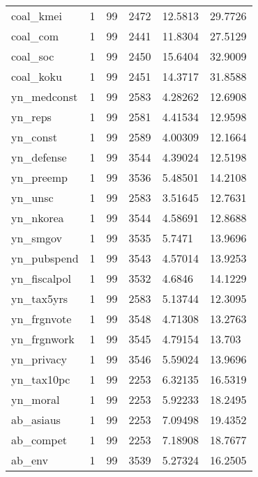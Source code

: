 \begin{tabular}{llllll}
coal\_kmei     &        1 &         99 &  2472 &   12.5813 &   29.7726 \\
coal\_com      &        1 &         99 &  2441 &   11.8304 &   27.5129 \\
coal\_soc      &        1 &         99 &  2450 &   15.6404 &   32.9009 \\
coal\_koku     &        1 &         99 &  2451 &   14.3717 &   31.8588 \\
yn\_medconst   &        1 &         99 &  2583 &   4.28262 &   12.6908 \\
yn\_reps       &        1 &         99 &  2581 &   4.41534 &   12.9598 \\
yn\_const      &        1 &         99 &  2589 &   4.00309 &   12.1664 \\
yn\_defense    &        1 &         99 &  3544 &   4.39024 &   12.5198 \\
yn\_preemp     &        1 &         99 &  3536 &   5.48501 &   14.2108 \\
yn\_unsc       &        1 &         99 &  2583 &   3.51645 &   12.7631 \\
yn\_nkorea     &        1 &         99 &  3544 &   4.58691 &   12.8688 \\
yn\_smgov      &        1 &         99 &  3535 &    5.7471 &   13.9696 \\
yn\_pubspend   &        1 &         99 &  3543 &   4.57014 &   13.9253 \\
yn\_fiscalpol  &        1 &         99 &  3532 &    4.6846 &   14.1229 \\
yn\_tax5yrs    &        1 &         99 &  2583 &   5.13744 &   12.3095 \\
yn\_frgnvote   &        1 &         99 &  3548 &   4.71308 &   13.2763 \\
yn\_frgnwork   &        1 &         99 &  3545 &   4.79154 &    13.703 \\
yn\_privacy    &        1 &         99 &  3546 &   5.59024 &   13.9696 \\
yn\_tax10pc    &        1 &         99 &  2253 &   6.32135 &   16.5319 \\
yn\_moral      &        1 &         99 &  2253 &   5.92233 &   18.2495 \\
ab\_asiaus     &        1 &         99 &  2253 &   7.09498 &   19.4352 \\
ab\_compet     &        1 &         99 &  2253 &   7.18908 &   18.7677 \\
ab\_env        &        1 &         99 &  3539 &   5.27324 &   16.2505 \\

\end{tabular}
